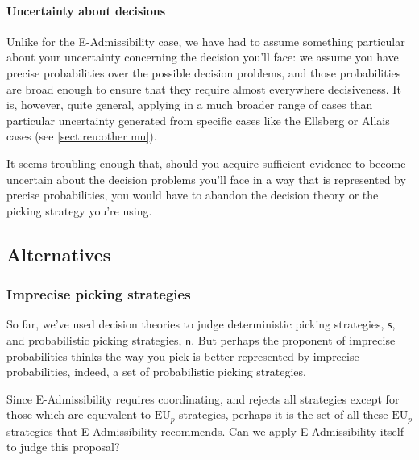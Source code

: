 \documentclass[a4paper]{article}
\newcommand\EU{\mathrm{EU}}
\newcommand\s{\mathsf{s}}
\renewcommand\c{\mathsf{c}} %
\newcommand{\n}{\mathsf{n}}
\newenvironment{CCM rewritten}
{\begingroup\color{blue}} %
{\endgroup}              %
\begin{document}
	\paragraph{Uncertainty about decisions}
	Unlike for the E-Admissibility case, we have had to assume something particular about your uncertainty concerning the decision you'll face: we assume you have precise probabilities over the possible decision problems, and those probabilities are broad enough to ensure that they require almost everywhere decisiveness. It is, however, quite general, applying in a much broader range of cases than particular uncertainty generated from specific cases like the Ellsberg or Allais cases (see \cref{sect:reu:other mu}).
	
	
	It seems troubling enough that, should you acquire sufficient evidence to become uncertain about the decision problems you'll face in a way that is represented by precise probabilities, you would have to abandon the decision theory or the picking strategy you're using. 


	
	\subsection{Alternatives}
	
	\subsubsection{Imprecise picking strategies}\label{sect:IPpicking}
	So far, we've used decision theories to judge deterministic picking strategies, $\s$, and probabilistic picking strategies, $\n$. 
	But perhaps the proponent of imprecise probabilities thinks the way you pick is better represented by imprecise probabilities, indeed, a set of probabilistic picking strategies. 
	

	Since E-Admissibility requires coordinating, and rejects all strategies except for those which are equivalent to $\EU_p$ strategies, perhaps it is the set of all these $\EU_p$ strategies that E-Admissibility recommends. Can we apply E-Admissibility itself to judge this proposal? 
	
\end{document}
